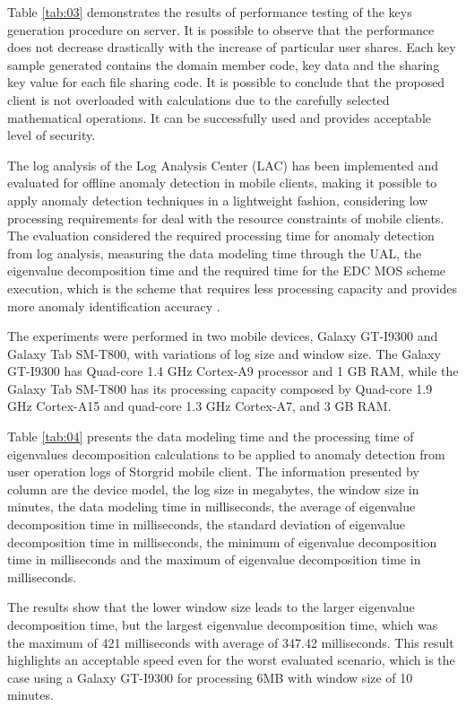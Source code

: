 \documentclass[twocolumn]{svjour3}          	%
\begin{document}
Table \ref{tab:03} demonstrates the results of performance testing of the keys generation procedure on server. It is possible to observe that the performance does not decrease drastically with the increase of particular user shares. Each key sample generated contains the domain member code, key data and the sharing key value for each file sharing code. It is possible to conclude that the proposed client is not overloaded with calculations due to the carefully selected mathematical operations. It can be successfully used and provides acceptable level of security.

The log analysis of the Log Analysis Center (LAC) has been implemented and evaluated for offline anomaly detection in mobile clients, making it possible to apply anomaly detection techniques in a lightweight fashion, considering low processing requirements for deal with the resource constraints of mobile clients. The evaluation considered the required processing time for anomaly detection from log analysis, measuring the data modeling time through the UAL, the eigenvalue decomposition time and the required time for the EDC MOS scheme execution, which is the scheme that requires less processing capacity and provides more anomaly identification accuracy \cite{da2009comparison,tenorio2013greatest}. 

The experiments were performed in two mobile devices, Galaxy GT-I9300 and Galaxy Tab SM-T800, with variations of log size and window size. The Galaxy GT-I9300 has Quad-core 1.4 GHz Cortex-A9 processor and 1 GB RAM, while the Galaxy Tab SM-T800 has its processing capacity composed by Quad-core 1.9 GHz Cortex-A15 and quad-core 1.3 GHz Cortex-A7, and 3 GB RAM.

Table \ref{tab:04} presents the data modeling time and the processing time of eigenvalues decomposition calculations to be applied to anomaly detection from user operation logs of Storgrid mobile client. The information presented by column are the device model, the log size in megabytes, the window size in minutes, the data modeling time in milliseconds, the average of eigenvalue decomposition time in milliseconds, the standard deviation of eigenvalue decomposition time in milliseconds, the minimum of eigenvalue decomposition time in milliseconds and the maximum of eigenvalue decomposition time in milliseconds.

The results show that the lower window size leads to the larger eigenvalue decomposition time, but the largest eigenvalue decomposition time, which was the maximum of 421 milliseconds with average of 347.42 milliseconds. This result highlights an acceptable speed even for the worst evaluated scenario, which is the case using a Galaxy GT-I9300 for processing 6MB with window size of 10 minutes.
\end{document}
